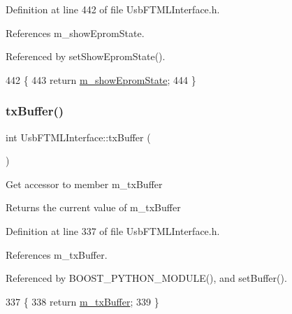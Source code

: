 Definition at line 442 of file Usb\+F\+T\+M\+L\+Interface.\+h.



References m\+\_\+show\+Eprom\+State.



Referenced by set\+Show\+Eprom\+State().


\begin{DoxyCode}
442                          \{
443     \textcolor{keywordflow}{return} \hyperlink{classUsbFTMLInterface_ac9505aba2e8a9fd9de9aed880a56a650}{m\_showEpromState};
444   \}  
\end{DoxyCode}
\mbox{\label{classUsbFTMLInterface_ada338c9311fdb6d788a951f41cf9101f}} 
\subsubsection{\texorpdfstring{tx\+Buffer()}{txBuffer()}}
{\footnotesize\ttfamily int Usb\+F\+T\+M\+L\+Interface\+::tx\+Buffer (\begin{DoxyParamCaption}{ }\end{DoxyParamCaption})\hspace{0.3cm}{\ttfamily [inline]}}

Get accessor to member m\+\_\+tx\+Buffer \begin{DoxyReturn}{Returns}
the current value of m\+\_\+tx\+Buffer 
\end{DoxyReturn}


Definition at line 337 of file Usb\+F\+T\+M\+L\+Interface.\+h.



References m\+\_\+tx\+Buffer.



Referenced by B\+O\+O\+S\+T\+\_\+\+P\+Y\+T\+H\+O\+N\+\_\+\+M\+O\+D\+U\+L\+E(), and set\+Buffer().


\begin{DoxyCode}
337                   \{
338     \textcolor{keywordflow}{return} \hyperlink{classUsbFTMLInterface_a4057fb62dc732ffe98df5c46231d7a23}{m\_txBuffer};
339   \}
\end{DoxyCode}
\mbox{\label{classUsbFTMLInterface_ad7e76fd952273faf094bf3475b2963da}} 
